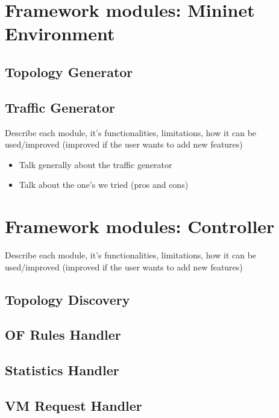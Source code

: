 \documentclass[12pt,english]{book}
\begin{document}
\section{Framework modules: Mininet Environment}

\subsection{Topology Generator}

\subsection{Traffic Generator}

Describe each module, it's functionalities, limitations, how it can be used/improved (improved if the user wants to add new features)

\begin{itemize}
	\item Talk generally about the traffic generator
	\item Talk about the one's we tried (pros and cons)
\end{itemize}

\newpage


\section{Framework modules: Controller}

Describe each module, it's functionalities, limitations, how it can be used/improved (improved if the user wants to add new features)

\subsection{Topology Discovery}

\subsection{OF Rules Handler}

\subsection{Statistics Handler}

\subsection{VM Request Handler}
\end{document}
